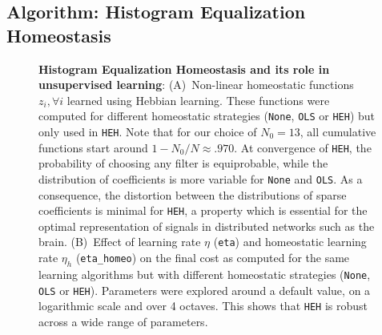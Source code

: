 \documentclass[draft]{article} %
\newcommand{\seeFig}[1]{Figure~\ref{fig:#1}}%
\begin{document}
\subsection{Algorithm: Histogram Equalization Homeostasis}\label{HEH}
\begin{figure}%
\caption{
{\bf Histogram Equalization Homeostasis and its role in unsupervised learning}:
{\sf (A)}~Non-linear homeostatic functions $z_i, \forall i$ learned using Hebbian learning. These functions were computed for different homeostatic strategies (\texttt{None}, \texttt{OLS} or \texttt{HEH}) but only used in \texttt{HEH}. Note that for our choice of $N_0=13$, all cumulative functions start around $1 - N_0/N \approx .970 $. At convergence of \texttt{HEH}, the probability of choosing any filter is equiprobable, while the distribution of coefficients is more variable for \texttt{None} and \texttt{OLS}. As a consequence, the distortion between the distributions of sparse coefficients is minimal for \texttt{HEH}, a property which is essential for the optimal representation of signals in distributed networks such as the brain. %
{\sf (B)}~Effect of learning rate $\eta$ (\texttt{eta}) and homeostatic learning rate $\eta_h$ (\texttt{eta\_homeo}) on the final cost as computed for the same learning algorithms but with different homeostatic strategies (\texttt{None}, \texttt{OLS} or \texttt{HEH}). Parameters were explored around a default value, on a logarithmic scale and over 4 octaves. This shows that \texttt{HEH} is robust across a wide range of parameters.
}
\end{figure}
\end{document}

